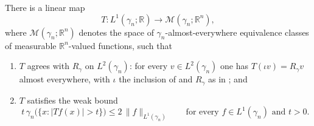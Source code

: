 \begin{lemma}
There is a linear map
\[
  T : L^1(\gamma_n;\mathbb{R}) \longrightarrow
      \mathcal{M}(\gamma_n;\mathbb{R}^n),
\]
where $\mathcal{M}(\gamma_n;\mathbb{R}^n)$ denotes the space of
$\gamma_n$-almost-everywhere equivalence classes of measurable
$\mathbb{R}^n$-valued functions, such that
\begin{enumerate}
\item $T$ agrees with $R_\gamma$ on $L^2(\gamma_n)$: for every
$v \in L^2(\gamma_n)$ one has $T(\iota v) = R_\gamma v$ almost everywhere, with
$\iota$ the inclusion of  and $R_\gamma$ as in
; and
\item $T$ satisfies the weak bound
\[
  t\,\gamma_n\bigl(\{x : |Tf(x)| > t\}\bigr) \leq 2\,\|f\|_{L^1(\gamma_n)}
  \qquad\text{for every } f \in L^1(\gamma_n) \text{ and } t > 0 .
\]
\end{enumerate}
\end{lemma}
